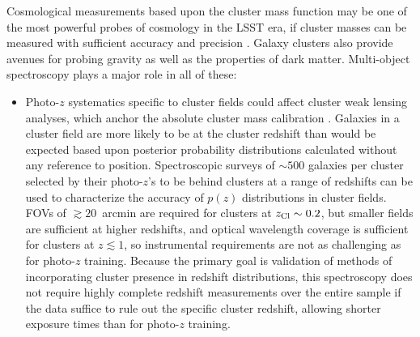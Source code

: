 Cosmological measurements based upon the cluster mass function may be one of the most powerful
probes of cosmology in the LSST era, if cluster masses can be measured with sufficient accuracy and
precision \citep{visions,Krause}.  Galaxy clusters also provide avenues for probing gravity as well as the properties of dark matter.  Multi-object spectroscopy plays a major role in all of these:

\begin{itemize}
\item Photo-$z$ systematics specific to cluster fields could affect cluster weak lensing analyses,
  which anchor the absolute cluster mass calibration \citep{Applegate}.  Galaxies in a cluster field
  are more likely to be at the cluster redshift than would be expected based upon posterior probability distributions calculated without any reference to position.  %
Spectroscopic surveys of $\sim 500$ galaxies per cluster selected by their photo-$z$'s to be behind clusters at
a range of redshifts can be used to
characterize the accuracy of $p(z)$ distributions in cluster fields.  FOVs of $\gtrsim 20$~arcmin are required for clusters at $z_{\rm
  Cl}\sim 0.2$, but smaller fields are sufficient at higher redshifts, and optical wavelength
coverage is sufficient for clusters at $z\lesssim1$, so instrumental requirements are not as challenging as
for photo-$z$ training.  
Because the primary goal is validation of methods of incorporating cluster presence in redshift
distributions, this spectroscopy does not require highly complete redshift measurements over the entire sample if the data suffice to rule out the specific cluster redshift, allowing shorter
exposure times than for photo-$z$ training.


\end{itemize}
